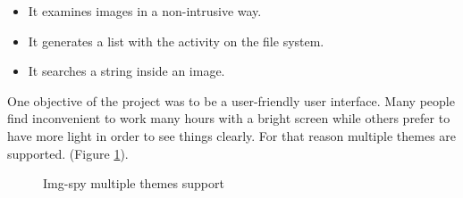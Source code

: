 \begin{itemize}
	\item[] 
	It examines images in a non-intrusive way.

	\item[] 
	It generates a list with the activity on the file system.

	\item[] 
	It searches a string inside an image.

\end{itemize}

One objective of the project was to be a user-friendly user interface. Many
people find inconvenient to work many hours with a bright screen while others
prefer to have more light in order to see things clearly. For that reason
multiple themes are supported. (Figure \ref{F:img-spy-multi-theme}). 

\begin{figure}[htb]
	\begin{center}
		\begin{subfigmatrix}{2}
		\end{subfigmatrix}
		\caption{Img-spy  multiple themes support}
		\label{F:img-spy-multi-theme}
	\end{center}
\end{figure}

